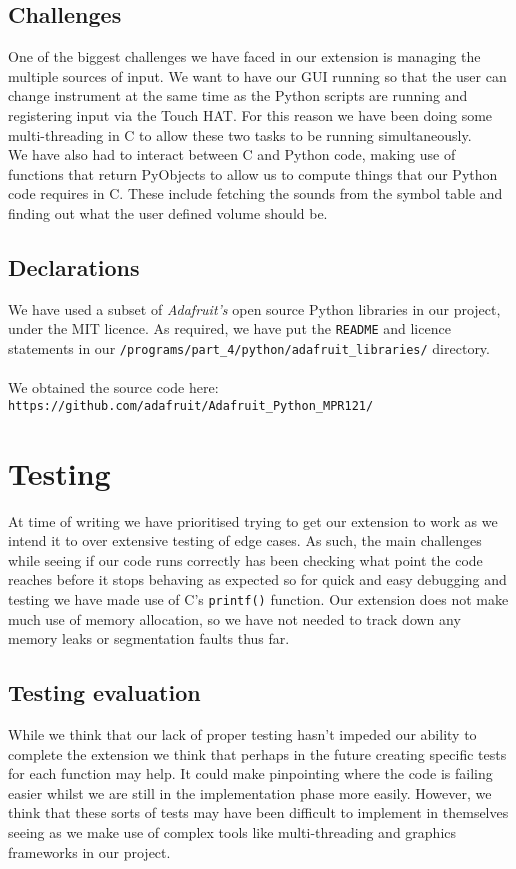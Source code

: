 \documentclass[11pt]{article}
\begin{document}
\subsection{Challenges}
	One of the biggest challenges we have faced in our extension is managing the multiple sources of input. We want to have our GUI running so that the user can change instrument at the same time as the Python scripts are running and registering input via the Touch HAT. For this reason we have been doing some multi-threading in C to allow these two tasks to be running simultaneously.\\
	
	We have also had to interact between C and Python code, making use of functions that return PyObjects to allow us to compute things that our Python code requires in C. These include fetching the sounds from the symbol table and finding out what the user defined volume should be.
	
	
\subsection{Declarations}
We have used a subset of \textit{Adafruit's} open source Python libraries in our project, under the MIT licence. As required, we have put the \texttt{README} and licence statements in our \texttt{/programs/part{\_}4/python/adafruit{\_}libraries/} directory.\\ \\
We obtained the source code here:
\texttt{https://github.com/adafruit/Adafruit{\_}Python{\_}MPR121/}

\section{Testing}
	At time of writing we have prioritised trying to get our extension to work as we intend it to over extensive testing of edge cases. As such, the main challenges while seeing if our code runs correctly has been checking what point the code reaches before it stops behaving as expected so for quick and easy debugging and testing we have made use of C's  \texttt{printf()} function. Our extension does not make much use of memory allocation, so we have not needed to track down any memory leaks or segmentation faults thus far.

\subsection{Testing evaluation}
While we think that our lack of proper testing hasn't impeded our ability to complete the extension we think that perhaps in the future creating specific tests for each function may help. It could make pinpointing where the code is failing easier whilst we are still in the implementation phase more easily. However, we think that these sorts of tests may have been difficult to implement in themselves seeing as we make use of complex tools like multi-threading and graphics frameworks in our project.
\end{document}
